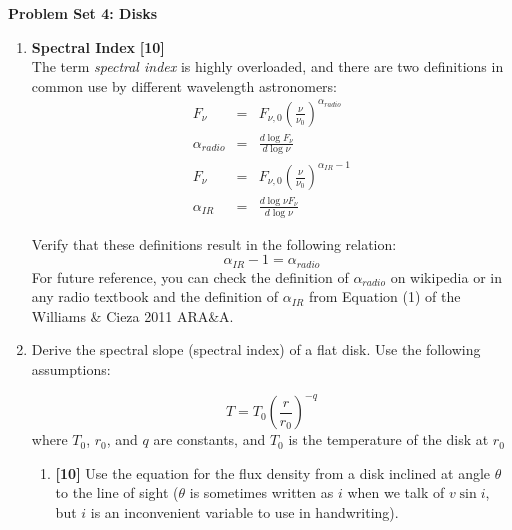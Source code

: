 \documentclass{article}
\begin{document}
\noindent\textbf{Problem Set 4: Disks}








\begin{enumerate}
    \item \textbf{Spectral Index} \textbf{[10]} \\
            The term \textit{spectral index} is highly overloaded, and there are two
            definitions in common use by different wavelength astronomers:
            \begin{eqnarray}
                F_\nu  & =&  F_{\nu,0} \left(\frac{\nu}{\nu_0}\right)^{\alpha_{radio}} \\
                \alpha_{radio} & = &  \frac{d \log {F_\nu}}{d \log \nu}\\
                F_\nu  & =&  F_{\nu,0} \left(\frac{\nu}{\nu_0}\right)^{\alpha_{IR} - 1} \\
                \alpha_{IR} & = & \frac{d \log \nu F_\nu}{d \log \nu}
            \end{eqnarray}

            Verify that these definitions result in the following relation:
            $$\alpha_{IR} - 1= \alpha_{radio}$$
            For future reference, you can check the definition of
            $\alpha_{radio}$ on wikipedia or in any radio textbook and the
            definition of $\alpha_{IR}$ from Equation (1) of the Williams \&
            Cieza 2011 ARA\&A.
\item 
    Derive the spectral slope (spectral index) of a flat disk.  Use the following assumptions:

    \begin{equation}
        \label{eqn:tpower}
        T = T_0 \left(\frac{r}{r_0}\right)^{-q}
    \end{equation}
    where $T_0$, $r_0$, and $q$ are constants, and $T_0$ is the temperature of the disk at $r_0$

    \begin{enumerate}
        \item \textbf{[10]}
        Use the equation for the flux density from a disk inclined at
            angle $\theta$ to the line of sight ($\theta$ is sometimes written
            as $i$ when we talk of $v \sin i$, but $i$ is an inconvenient
            variable to use in handwriting).


\end{enumerate}
\end{enumerate}
\end{document}
